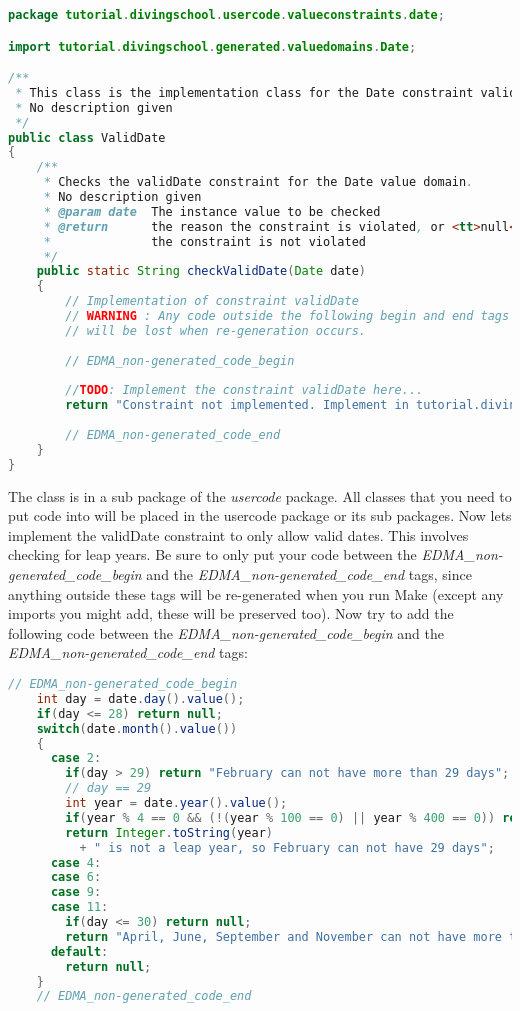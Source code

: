 \begin{lstlisting}[basicstyle={\scriptsize},breaklines=true,language=Java,tabsize=2]
package tutorial.divingschool.usercode.valueconstraints.date;

import tutorial.divingschool.generated.valuedomains.Date;

/**
 * This class is the implementation class for the Date constraint validDate
 * No description given
 */
public class ValidDate
{
    /**
     * Checks the validDate constraint for the Date value domain.
     * No description given
     * @param date  The instance value to be checked
     * @return      the reason the constraint is violated, or <tt>null</tt> if
     *              the constraint is not violated
     */
    public static String checkValidDate(Date date)
    {
        // Implementation of constraint validDate
        // WARNING : Any code outside the following begin and end tags
        // will be lost when re-generation occurs.
        
        // EDMA_non-generated_code_begin
        
        //TODO: Implement the constraint validDate here...
        return "Constraint not implemented. Implement in tutorial.divingschool.usercode.valueconstraints.date.ValidDate";
        
        // EDMA_non-generated_code_end
    }
}
\end{lstlisting}


The class is in a sub package of the \emph{usercode} package. All
classes that you need to put code into will be placed in the usercode
package or its sub packages. Now lets implement the validDate constraint
to only allow valid dates. This involves checking for leap years.
Be sure to only put your code between the \emph{EDMA\_non-generated\_code\_begin}
and the \emph{EDMA\_non-generated\_code\_end} tags, since anything
outside these tags will be re-generated when you run Make (except
any imports you might add, these will be preserved too). Now try to
add the following code between the \emph{EDMA\_non-generated\_code\_begin}
and the \emph{EDMA\_non-generated\_code\_end} tags: 

\begin{lstlisting}[basicstyle={\scriptsize},language=Java,tabsize=2]
    // EDMA_non-generated_code_begin
    int day = date.day().value();
    if(day <= 28) return null;
    switch(date.month().value())
    {
      case 2:
        if(day > 29) return "February can not have more than 29 days";
        // day == 29
        int year = date.year().value();
        if(year % 4 == 0 && (!(year % 100 == 0) || year % 400 == 0)) return null;
        return Integer.toString(year)
          + " is not a leap year, so February can not have 29 days";
      case 4:
      case 6:
      case 9:
      case 11:
        if(day <= 30) return null;
        return "April, June, September and November can not have more than 30 days";
      default:
        return null;
    }
    // EDMA_non-generated_code_end
\end{lstlisting}


